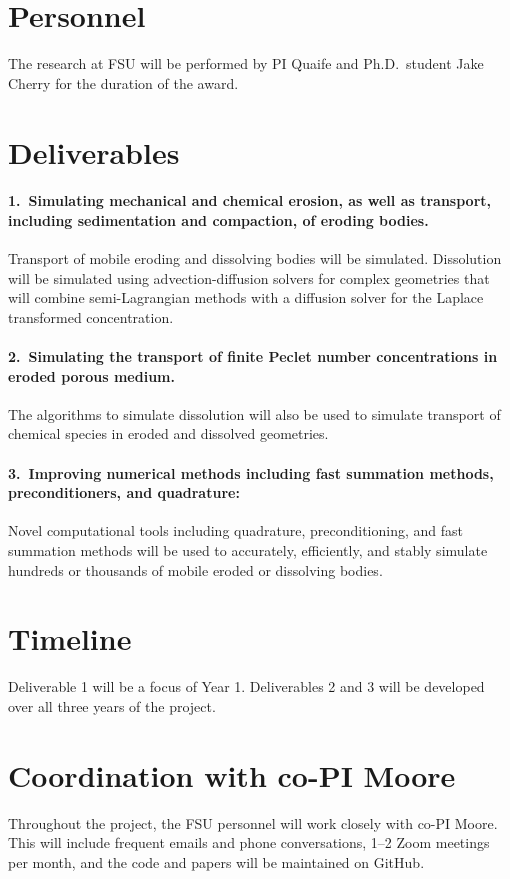 \documentclass[11pt]{article}
\begin{document}
\section*{Personnel}
The research at FSU will be performed by PI Quaife and Ph.D.~student
Jake Cherry for the duration of the award.

\section*{Deliverables}
\paragraph{1.~Simulating mechanical and chemical erosion, as well as
transport, including sedimentation and compaction, of eroding bodies.}
Transport of mobile eroding and dissolving bodies will be simulated.
Dissolution will be simulated using advection-diffusion solvers for
complex geometries that will combine semi-Lagrangian methods with a
diffusion solver for the Laplace transformed concentration.
    
\paragraph{2.~Simulating the transport of finite Peclet number
concentrations in eroded porous medium.} The algorithms to simulate
dissolution will also be used to simulate transport of chemical species
in eroded and dissolved geometries.

\paragraph{3.~Improving numerical methods including fast summation
methods, preconditioners, and quadrature:} Novel computational tools
including quadrature, preconditioning, and fast summation methods will
be used to accurately, efficiently, and stably simulate hundreds or
thousands of mobile eroded or dissolving bodies.

\section*{Timeline}
Deliverable 1 will be a focus of Year 1. Deliverables 2 and 3 will be
developed over all three years of the project.

\section*{Coordination with co-PI Moore}
Throughout the project, the FSU personnel will work closely with co-PI
Moore. This will include frequent emails and phone conversations, 1--2
Zoom meetings per month, and the code and papers will be maintained on
GitHub.
\end{document}
